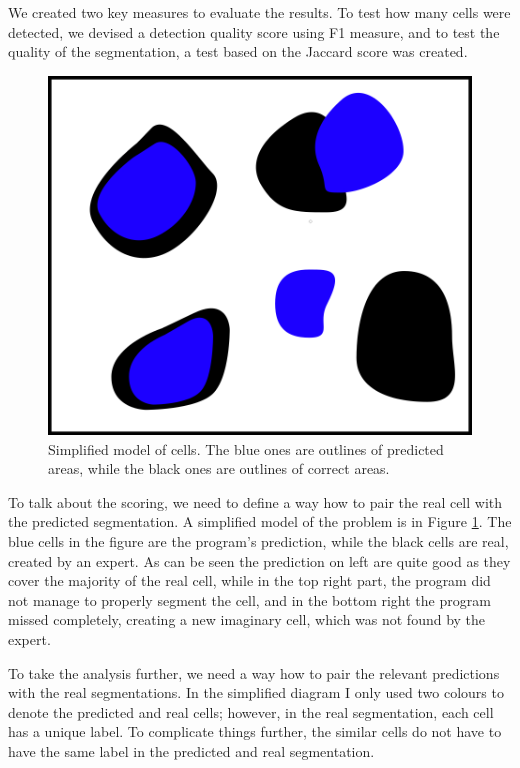 \documentclass[
  digital,     %
  oneside,     %
  nosansbold,  %
  nocolorbold, %
  lof,         %
  lot,         %
]{fithesis4}
\begin{document}
We created two key measures to evaluate the results. To test how many cells were
detected, we devised a detection quality score using F1 measure, and to test the
quality of the segmentation, a test based on the Jaccard score was created.
\begin{figure}
    \begin{center}
        \includegraphics{resources/inkscape/evaluation.png}
    \end{center}
    \caption{Simplified model of cells. The blue ones are
    outlines of predicted areas, while the black ones are outlines of correct
    areas.}
    \label{fig:evaluation_basic}
\end{figure}
To talk about the scoring, we need to define a way how to pair the real cell
with the predicted segmentation. A simplified model of the problem is in Figure
\ref{fig:evaluation_basic}. The blue cells in the figure are the program's
prediction, while the black cells are real, created by an expert. As can be seen
the prediction on left are quite good as they cover the majority of the real
cell, while in the top right part, the program did not manage to properly
segment the cell, and in the bottom right the program missed completely,
creating a new imaginary cell, which was not found by the expert.

To take the analysis further, we need a way how to pair the relevant predictions
with the real segmentations. In the simplified diagram I only used two colours
to denote the predicted and real cells; however, in the real segmentation, each
cell has a unique label. To complicate things further, the similar cells do not
have to have the same label in the predicted and real segmentation.
\end{document}
